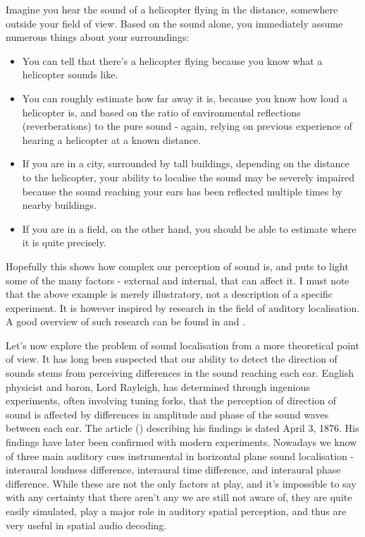 Imagine you hear the sound of a helicopter flying in the distance, somewhere outside your field of view.
Based on the sound alone, you immediately assume numerous things about your surroundings:
\begin{itemize}
    \item You can tell that there's a helicopter flying because you know what a helicopter sounds like.
    \item You can roughly estimate how far away it is, because you know 
    how loud a helicopter is, and based on the ratio of environmental reflections (reverberations) to the pure sound
    - again, relying on previous experience of hearing a helicopter at a known distance.
    \item If you are in a city, surrounded by tall buildings, depending on the distance to the helicopter, your ability to localise the sound may be severely 
    impaired because the sound reaching your ears has been reflected multiple times by nearby buildings.
    \item If you are in a field, on the other hand, you should be able to estimate where it is quite precisely. 
\end{itemize}

Hopefully this shows how complex our perception of sound is, and puts to light some of the many factors - external and internal, that can affect it.
I must note that the above example is merely illustratory, not a description of a specific experiment.
It is however inspired by research in the field of auditory localisation.
A good overview of such research can be found in \cite{localization_clinical_neurology} and \cite{auditory_distance_moore}.

Let's now explore the problem of sound localisation from a more theoretical point of view.
It has long been suspected that our ability to detect the direction of sounds
stems from perceiving differences in the sound reaching each ear.
English physicist and baron, Lord Rayleigh, has determined through ingenious experiments, 
often involving tuning forks, that the perception of direction of sound is affected 
by differences in amplitude and phase of the sound waves between each ear. The article (\cite{on_our_perception_of_dir_of_sound}) describing his findings is dated April 3, 1876. 
His findings have later been confirmed with modern experiments. Nowadays we know of three main auditory cues instrumental in horizontal plane sound localisation - interaural loudness difference,
interaural time difference, and interaural phase difference.
While these are not the only factors at play, and it's impossible to say with any certainty that there aren't any we are still not aware of,
they are quite easily simulated, play a major role in auditory spatial perception,
and thus are very useful in spatial audio decoding.
\cite{localization_clinical_neurology}\cite{sound_localization_article}\cite{new_realities_in_audio}

